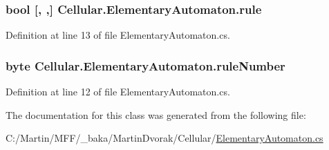 \subsubsection[{rule}]{\setlength{\rightskip}{0pt plus 5cm}bool \mbox{[}, ,\mbox{]} Cellular.\+Elementary\+Automaton.\+rule\hspace{0.3cm}{\ttfamily [protected]}}\label{class_cellular_1_1_elementary_automaton_a7de75f196155059435ac9098aa6b2a52}


Definition at line 13 of file Elementary\+Automaton.\+cs.

\hypertarget{class_cellular_1_1_elementary_automaton_aa9221b2c09faebf1dd67ba75194b15f8}{}
\subsubsection[{rule\+Number}]{\setlength{\rightskip}{0pt plus 5cm}byte Cellular.\+Elementary\+Automaton.\+rule\+Number\hspace{0.3cm}{\ttfamily [protected]}}\label{class_cellular_1_1_elementary_automaton_aa9221b2c09faebf1dd67ba75194b15f8}


Definition at line 12 of file Elementary\+Automaton.\+cs.



The documentation for this class was generated from the following file\+:\begin{DoxyCompactItemize}
\item 
C\+:/\+Martin/\+M\+F\+F/\+\_\+baka/\+Martin\+Dvorak/\+Cellular/\hyperlink{_elementary_automaton_8cs}{Elementary\+Automaton.\+cs}\end{DoxyCompactItemize}

